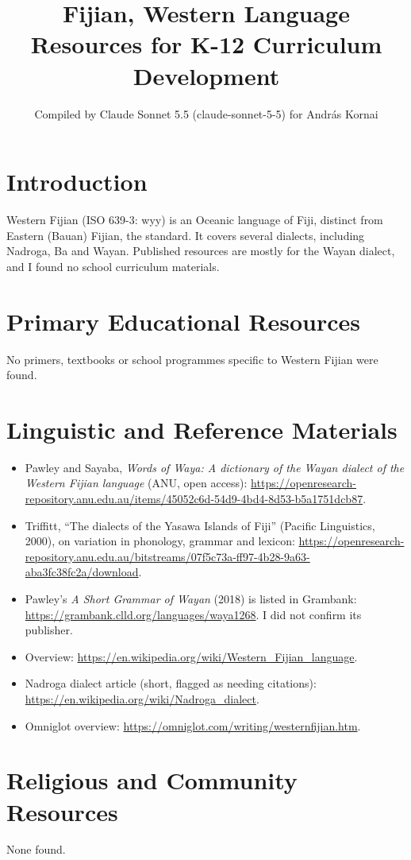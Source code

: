 \documentclass[12pt]{article}
\title{Fijian, Western Language Resources for K-12 Curriculum Development}
\author{Compiled by Claude Sonnet 5.5 (claude-sonnet-5-5) for Andr\'as Kornai}
\date{}
\begin{document}
\maketitle

\section{Introduction}
Western Fijian (ISO 639-3: wyy) is an Oceanic language of Fiji, distinct from Eastern (Bauan) Fijian, the standard. It covers several dialects, including Nadroga, Ba and Wayan. Published resources are mostly for the Wayan dialect, and I found no school curriculum materials.

\section{Primary Educational Resources}
No primers, textbooks or school programmes specific to Western Fijian were found.

\section{Linguistic and Reference Materials}
\begin{itemize}
\item Pawley and Sayaba, \emph{Words of Waya: A dictionary of the Wayan dialect of the Western Fijian language} (ANU, open access): \url{https://openresearch-repository.anu.edu.au/items/45052c6d-54d9-4bd4-8d53-b5a1751dcb87}.
\item Triffitt, ``The dialects of the Yasawa Islands of Fiji'' (Pacific Linguistics, 2000), on variation in phonology, grammar and lexicon: \url{https://openresearch-repository.anu.edu.au/bitstreams/07f5c73a-ff97-4b28-9a63-aba3fc38fc2a/download}.
\item Pawley's \emph{A Short Grammar of Wayan} (2018) is listed in Grambank: \url{https://grambank.clld.org/languages/waya1268}. I did not confirm its publisher.
\item Overview: \url{https://en.wikipedia.org/wiki/Western_Fijian_language}.
\item Nadroga dialect article (short, flagged as needing citations): \url{https://en.wikipedia.org/wiki/Nadroga_dialect}.
\item Omniglot overview: \url{https://omniglot.com/writing/westernfijian.htm}.
\end{itemize}

\section{Religious and Community Resources}
None found.
\end{document}
